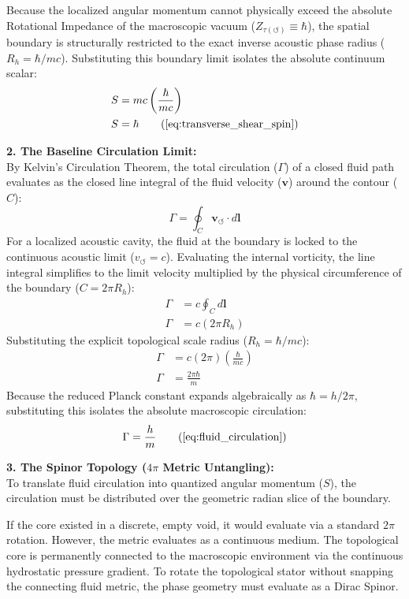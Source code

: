 \documentclass[11pt, a4paper]{article}
\begin{document}
Because the localized angular momentum cannot physically exceed the absolute Rotational Impedance of the macroscopic vacuum ($Z_{\tau(\circlearrowleft)} \equiv \hbar$), the spatial boundary is structurally restricted to the exact inverse acoustic phase radius ($R_h = \hbar / mc$). Substituting this boundary limit isolates the absolute continuum scalar:
\begin{align}
    S &= m c \left( \frac{\hbar}{mc} \right) \nonumber \\
    S &= \hbar \tag{\ref{eq:transverse_shear_spin}}
\end{align}

\textbf{2. The Baseline Circulation Limit:} \\
By Kelvin's Circulation Theorem, the total circulation ($\Gamma$) of a closed fluid path evaluates as the closed line integral of the fluid velocity ($\mathbf{v}$) around the contour ($C$):
\begin{equation}
    \Gamma = \oint_C \mathbf{v}_{\circlearrowleft} \cdot d\mathbf{l} 
\end{equation}
For a localized acoustic cavity, the fluid at the boundary is locked to the continuous acoustic limit ($v_{\circlearrowleft} = c$). Evaluating the internal vorticity, the line integral simplifies to the limit velocity multiplied by the physical circumference of the boundary ($C = 2\pi R_h$):
\begin{align}
    \Gamma &= c \oint_C d\mathbf{l}  \\
    \Gamma &= c (2\pi R_h) 
\end{align}
Substituting the explicit topological scale radius ($R_h = \hbar / mc$):
\begin{align}
    \Gamma &= c (2\pi) \left( \frac{\hbar}{m c} \right)  \\
    \Gamma &= \frac{2\pi \hbar}{m} 
\end{align}
Because the reduced Planck constant expands algebraically as $\hbar = h / 2\pi$, substituting this isolates the absolute macroscopic circulation:
\begin{equation}
    \Gamma = \frac{h}{m} \tag{\ref{eq:fluid_circulation}}
\end{equation}

\textbf{3. The Spinor Topology ($4\pi$ Metric Untangling):} \\
To translate fluid circulation into quantized angular momentum ($S$), the circulation must be distributed over the geometric radian slice of the boundary. 

If the core existed in a discrete, empty void, it would evaluate via a standard $2\pi$ rotation. However, the metric evaluates as a continuous medium. The topological core is permanently connected to the macroscopic environment via the continuous hydrostatic pressure gradient. To rotate the topological stator without snapping the connecting fluid metric, the phase geometry must evaluate as a Dirac Spinor. 
\end{document}
